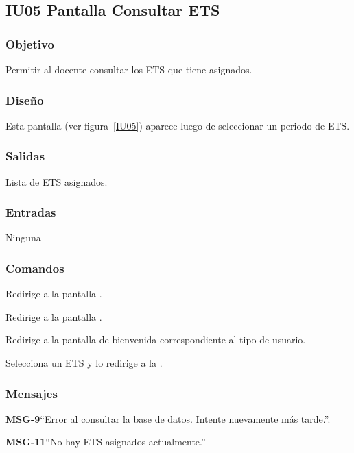 \subsection{IU05 Pantalla Consultar ETS}

\subsubsection{Objetivo}
	Permitir al docente consultar los ETS que tiene asignados. 

\subsubsection{Diseño}
	Esta pantalla  (ver figura~\ref{IU05}) aparece luego de seleccionar un periodo de ETS. 


\subsubsection{Salidas}
	Lista de ETS asignados. 

\subsubsection{Entradas}
	Ninguna
	
\subsubsection{Comandos}
\begin{Citemize}

	\item {} Redirige a la pantalla .
	\item {} Redirige a la pantalla .
	\item {} Redirige a la pantalla de bienvenida correspondiente al tipo de usuario.
	\item {} Selecciona un ETS y lo redirige a la .
\end{Citemize}

\subsubsection{Mensajes}

\begin{Citemize}
	\item {\bf MSG-9}{``Error al consultar la base de datos. Intente nuevamente más tarde.''.}
	\item {\bf MSG-11}{``No hay ETS asignados actualmente.''}
\end{Citemize}


